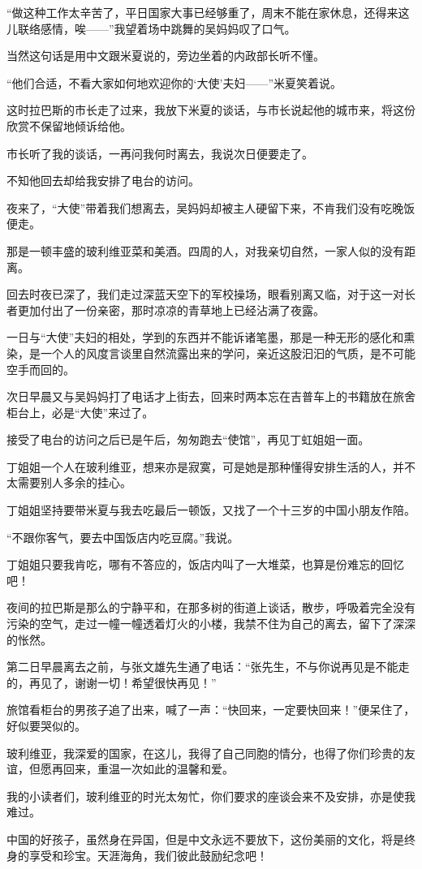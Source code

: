 \par “做这种工作太辛苦了，平日国家大事已经够重了，周末不能在家休息，还得来这儿联络感情，唉——”我望着场中跳舞的吴妈妈叹了口气。
\par 当然这句话是用中文跟米夏说的，旁边坐着的内政部长听不懂。
\par “他们合适，不看大家如何地欢迎你的‘大使’夫妇——”米夏笑着说。
\par 这时拉巴斯的市长走了过来，我放下米夏的谈话，与市长说起他的城市来，将这份欣赏不保留地倾诉给他。
\par 市长听了我的谈话，一再问我何时离去，我说次日便要走了。
\par 不知他回去却给我安排了电台的访问。
\par 夜来了，“大使”带着我们想离去，吴妈妈却被主人硬留下来，不肯我们没有吃晚饭便走。
\par 那是一顿丰盛的玻利维亚菜和美酒。四周的人，对我亲切自然，一家人似的没有距离。
\par 回去时夜已深了，我们走过深蓝天空下的军校操场，眼看别离又临，对于这一对长者更加付出了一份亲密，那时凉凉的青草地上已经沾满了夜露。
\par 一日与“大使”夫妇的相处，学到的东西并不能诉诸笔墨，那是一种无形的感化和熏染，是一个人的风度言谈里自然流露出来的学问，亲近这股汩汩的气质，是不可能空手而回的。
\par 次日早晨又与吴妈妈打了电话才上街去，回来时两本忘在吉普车上的书籍放在旅舍柜台上，必是“大使”来过了。
\par 接受了电台的访问之后已是午后，匆匆跑去“使馆”，再见丁虹姐姐一面。
\par 丁姐姐一个人在玻利维亚，想来亦是寂寞，可是她是那种懂得安排生活的人，并不太需要别人多余的挂心。
\par 丁姐姐坚持要带米夏与我去吃最后一顿饭，又找了一个十三岁的中国小朋友作陪。
\par “不跟你客气，要去中国饭店内吃豆腐。”我说。
\par 丁姐姐只要我肯吃，哪有不答应的，饭店内叫了一大堆菜，也算是份难忘的回忆吧！
\par 夜间的拉巴斯是那么的宁静平和，在那多树的街道上谈话，散步，呼吸着完全没有污染的空气，走过一幢一幢透着灯火的小楼，我禁不住为自己的离去，留下了深深的怅然。
\par 第二日早晨离去之前，与张文雄先生通了电话：“张先生，不与你说再见是不能走的，再见了，谢谢一切！希望很快再见！”
\par 旅馆看柜台的男孩子追了出来，喊了一声：“快回来，一定要快回来！”便呆住了，好似要哭似的。
\par 玻利维亚，我深爱的国家，在这儿，我得了自己同胞的情分，也得了你们珍贵的友谊，但愿再回来，重温一次如此的温馨和爱。
\par 我的小读者们，玻利维亚的时光太匆忙，你们要求的座谈会来不及安排，亦是使我难过。
\par 中国的好孩子，虽然身在异国，但是中文永远不要放下，这份美丽的文化，将是终身的享受和珍宝。天涯海角，我们彼此鼓励纪念吧！

